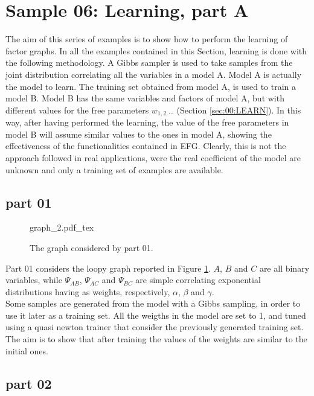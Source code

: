 
\section{Sample 06: Learning, part A}

The aim of this series of examples is to show how to perform the learning of factor graphs.
In all the examples contained in this Section, learning is done with the following methodology.
A Gibbs sampler is used to take samples from the joint distribution correlating all the variables in a model A. Model A is actually the model to learn. The training set obtained from model A, is used to train a model B. Model B has the same variables and factors of model A, but with different values for the free parameters $w_{1,2,\cdots}$ (Section \ref{sec:00:LEARN}). In this way, after having performed the learning, the value of the free parameters in model B will assume similar values to the ones in model A, showing the effectiveness of the functionalities contained in EFG. Clearly, this is not the approach followed in real applications, were the real coefficient of the model are unknown and only a training set of examples are available.

\subsection{part 01}
\label{sample_tuning}

\begin{figure}
	\centering
\def\svgwidth{0.3 \textwidth}
{graph_2.pdf_tex} 
\caption{The graph considered by part 01.}
\label{fig:sample_06:0}
\end{figure}

Part 01 considers the loopy graph reported in Figure \ref{fig:sample_06:0}. $A$, $B$ and $C$ are all binary variables, while $\Psi_{AB}$, $\Psi_{AC}$ and $\Psi_{BC}$ are simple correlating exponential distributions having as weights, respectively, $\alpha$, $\beta$ and $\gamma$. 
\\
Some samples are generated from the model with a Gibbs sampling, in order to use it later as a training set.
All the weigths in the model are set to 1, and tuned using a quasi newton trainer that consider the previously generated training set.
The aim is to show that after training the values of the weights are similar to the initial ones.

\subsection{part 02}

